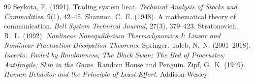 \documentclass[11pt]{article}
\begin{document}
\begin{thebibliography}{99}
 Seykota, E. (1991). Trading system heat. \emph{Technical Analysis of Stocks and Commodities}, 9(1), 42--45.
 Shannon, C.~E. (1948). A mathematical theory of communication. \emph{Bell System Technical Journal}, 27(3), 379--423.
 Stratonovich, R.~L. (1992). \emph{Nonlinear Nonequilibrium Thermodynamics I: Linear and Nonlinear Fluctuation-Dissipation Theorems}. Springer.
 Taleb, N.~N. (2001--2018). \emph{Incerto: Fooled by Randomness; The Black Swan; The Bed of Procrustes; Antifragile; Skin in the Game}. Random House and Penguin.
 Zipf, G.~K. (1949). \emph{Human Behavior and the Principle of Least Effort}. Addison-Wesley.
\end{thebibliography}
\end{document}
